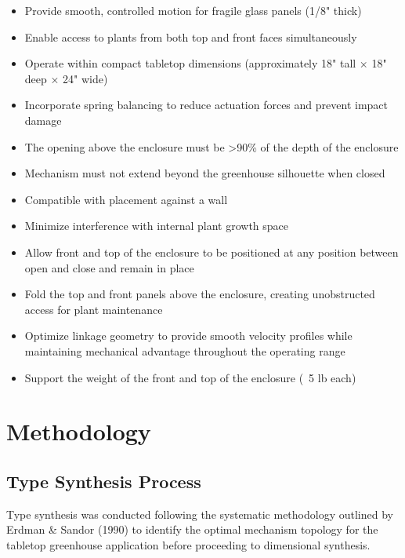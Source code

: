 \documentclass[12pt]{article}
\begin{document}
\begin{itemize}
    \item Provide smooth, controlled motion for fragile glass panels (1/8" thick)
    \item Enable access to plants from both top and front faces simultaneously
    \item Operate within compact tabletop dimensions (approximately 18" tall × 18" deep × 24" wide)
    \item Incorporate spring balancing to reduce actuation forces and prevent impact damage
    \item The opening above the enclosure must be >90\% of the depth of the enclosure
    \item Mechanism must not extend beyond the greenhouse silhouette when closed
    \item Compatible with placement against a wall
    \item Minimize interference with internal plant growth space
    \item Allow front and top of the enclosure to be positioned at any position between open and close and remain in place
    \item Fold the top and front panels above the enclosure, creating unobstructed access for plant maintenance
    \item Optimize linkage geometry to provide smooth velocity profiles while maintaining mechanical advantage throughout the operating range
    \item Support the weight of the front and top of the enclosure (~5 lb each)
\end{itemize}

\section{Methodology}
\label{sec:methodology}

\subsection{Type Synthesis Process}
\label{sec:type_synthesis}

Type synthesis was conducted following the systematic methodology outlined by Erdman \& Sandor (1990) to identify the optimal mechanism topology for the tabletop greenhouse application before proceeding to dimensional synthesis. 
\end{document}
